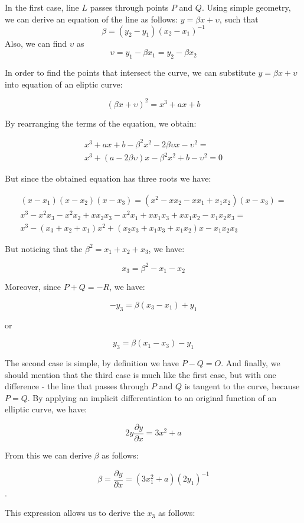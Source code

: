In the first case, line $L$ passes through points $P$ and $Q$. Using simple geometry, 
we can derive an equation of the line as follows: $y = \beta x + \upsilon$, such that
$$\beta = (y_2-y_1)(x_2-x_1)^{-1}$$ Also, we can find $\upsilon$ as 
$$\upsilon=y_1-\beta x_1=y_2-\beta x_2$$

In order to find the points that intersect the curve, we can substitute $y=\beta x+ \upsilon$
into equation of an eliptic curve:

$$(\beta x+ \upsilon)^2=x^3+ax+b$$

By rearranging the terms of the equation, we obtain:

\begin{multline*}
x^3+ax+b-\beta^2x^2-2\beta \upsilon x - \upsilon^2=\\
x^3+(a-2\beta \upsilon)x-\beta^2x^2+b-\upsilon^2=0
\end{multline*}

But since the obtained equation has three roots we have:

\begin{multline*}
(x-x_1)(x-x_2)(x-x_3)=(x^2-xx_2-xx_1+x_1x_2)(x-x_3)=\\
x^3-x^2x_3-x^2x_2+xx_2x_3-x^2x_1+xx_1x_3+xx_1x_2-x_1x_2x_3 = \\
x^3-(x_3+x_2+x_1)x^2+(x_2x_3+x_1x_3+x_1x_2)x-x_1x_2x_3
\end{multline*}

But noticing that the $\beta^2=x_1+x_2+x_3$, we have:

$$x_3=\beta^2-x_1-x_2$$

Moreover, since $P+Q=-R$, we have:

$$-y_3=\beta(x_3-x_1) + y_1$$

or

$$y_3=\beta(x_1-x_3) - y_1$$

The second case is simple, by definition we have $P-Q=O$.
And finally, we should mention that the third case is much like 
the first case, but with one difference - the line that passes through
$P$ and $Q$ is tangent to the curve, because $P=Q$. By applying an
implicit differentiation to an original function of an elliptic curve,
we have:

$$2y\frac{\partial y}{\partial x}=3x^2+a$$

From this we can derive $\beta$ as follows:

$$\beta = \frac{\partial y}{\partial x}=(3x_1^2+a)(2y_1)^{-1}$$.

This expression allows us to derive the $x_3$ as follows:

